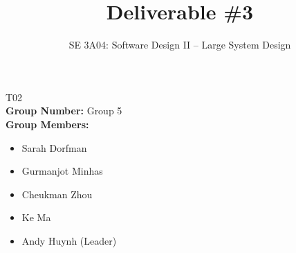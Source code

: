 \documentclass[]{article}
\title{Deliverable \#3}
\author{SE 3A04: Software Design II -- Large System Design}
\date{}
\numberwithin{figure}{section} %
\begin{document}
\maketitle	
{} T02\\
{\bf Group Number:} Group 5 \\
{\bf Group Members:} 
\begin{itemize}
	\item Sarah Dorfman
	\item Gurmanjot Minhas
	\item Cheukman Zhou
	\item Ke Ma
	\item Andy Huynh (Leader)
\end{itemize}
















\end{document}
